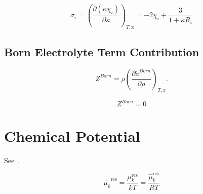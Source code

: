 \documentclass[12pt, letterpaper]{article}
\begin{document}
\begin{equation}
    \sigma_{i}=\left(\frac{\partial(\kappa\chi_{i})}{\partial\kappa}\right)_{T,\mathrm{x}}=-2\chi_{i}+\frac{3}{1+\kappa R_{i}}
    \label{eq:sigma_dh_bjerrum}
\end{equation}

\subsection{Born Electrolyte Term Contribution}


\begin{equation}
    Z^{Born} =\rho\left(\frac{\partial\tilde{a}^{Born}}{\partial\rho}\right)_{T,x}
    .
    \label{eq:z_born}
\end{equation}


\begin{equation}
    Z^{Born}= 0
    \label{eq:z_born_zero}
\end{equation}



\section{Chemical Potential}

See~\cite{Gross2001}.

\begin{equation}
    \tilde{\mu_{k}}^{\mathrm{res}}=\frac{\mu_{k}^\mathrm{res}}{kT} = \frac{\hat{\mu}_{k}^\mathrm{res}}{RT}
    \label{eq:mu_res}
\end{equation}

\end{document}
